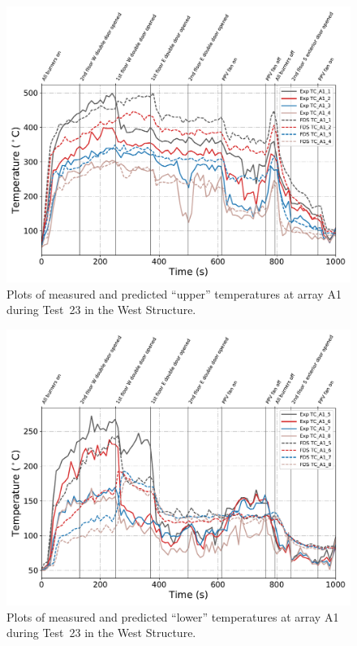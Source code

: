 \begin{figure}[!h]
	\centering
	\includegraphics[width=\columnwidth]{Figures/Plots/Validation/Temperature/Test_23_TC_A1_upper}
	\caption{Plots of measured and predicted ``upper'' temperatures at array A1 during Test~23 in the West Structure.}
	\label{fig:TCA1_upper_data_Test23}
\end{figure}
\begin{figure}[!h]
	\centering
	\includegraphics[width=\columnwidth]{Figures/Plots/Validation/Temperature/Test_23_TC_A1_lower}
	\caption{Plots of measured and predicted ``lower'' temperatures at array A1 during Test~23 in the West Structure.}
	\label{fig:TCA1_lower_data_Test23}
\end{figure}

